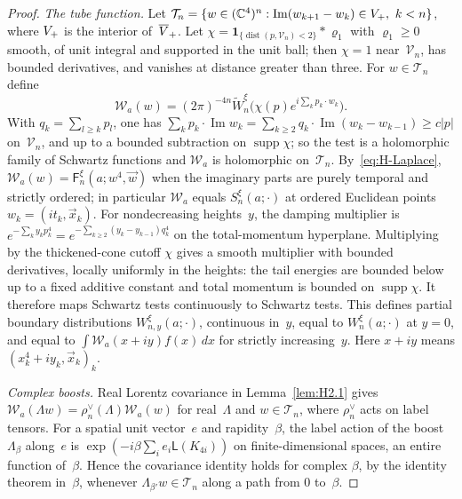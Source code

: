 \begin{proof}
\emph{The tube function.} Let $\mathcal T_n=\{w\in(\C^4)^n:\operatorname{Im}(w_{k+1}-w_k)\in\openforwardcone,\ k<n\}$, where $V_+$ is the interior of~$\overline{V}_+$. Let $\chi=\mathbf1_{\{\operatorname{dist}(p,\mathcal V_n)<2\}}*\varrho_1$ with $\varrho_1\ge0$ smooth, of unit integral and supported in the unit ball; then $\chi=1$ near~$\mathcal V_n$, has bounded derivatives, and vanishes at distance greater than three. For $w\in\mathcal T_n$ define
\begin{equation*}
\mathcal W_a(w)=(2\pi)^{-4n}\widetilde W_n^\xi\bigl(\chi(p)e^{i\sum_kp_k\cdot w_k}\bigr).
\end{equation*}
With $q_k=\sum_{l\ge k}p_l$, one has $\sum_kp_k\cdot\operatorname{Im}w_k=\sum_{k\ge2}q_k\cdot\operatorname{Im}(w_k-w_{k-1})\ge c|p|$ on~$\mathcal V_n$, and up to a bounded subtraction on $\operatorname{supp}\chi$; so the test is a holomorphic family of Schwartz functions and $\mathcal W_a$ is holomorphic on~$\mathcal T_n$. By~\eqref{eq:H-Laplace}, $\mathcal W_a(w)=\mathsf F^\xi_n(a;w^4,\vec w)$ when the imaginary parts are purely temporal and strictly ordered; in particular $\mathcal W_a$ equals $S^\xi_n(a;\cdot)$ at ordered Euclidean points $w_k=(it_k,\vec x_k)$. For nondecreasing heights~$y$, the damping multiplier is $e^{-\sum_ky_kp^4_k}=e^{-\sum_{k\ge2}(y_k-y_{k-1})q_k^4}$ on the total-momentum hyperplane. Multiplying by the thickened-cone cutoff $\chi$ gives a smooth multiplier with bounded derivatives, locally uniformly in the heights: the tail energies are bounded below up to a fixed additive constant and total momentum is bounded on $\operatorname{supp}\chi$. It therefore maps Schwartz tests continuously to Schwartz tests. This defines partial boundary distributions $W^\xi_{n,y}(a;\cdot)$, continuous in~$y$, equal to $W^\xi_n(a;\cdot)$ at $y=0$, and equal to $\int\mathcal W_a(x+iy)f(x)\,dx$ for strictly increasing~$y$. Here $x+iy$ means $(x_k^4+iy_k,\vec x_k)_k$.

\emph{Complex boosts.} Real Lorentz covariance in Lemma~\ref{lem:H2.1} gives $\mathcal W_a(\Lambda w)=\rho_n^\vee(\Lambda)\mathcal W_a(w)$ for real~$\Lambda$ and $w\in\mathcal T_n$, where $\rho_n^\vee$ acts on label tensors. For a spatial unit vector~$e$ and rapidity~$\beta$, the label action of the boost $\Lambda_\beta$ along~$e$ is $\exp(-i\beta\sum_ie_i\mathsf L(K_{4i}))$ on finite-dimensional spaces, an entire function of~$\beta$. Hence the covariance identity holds for complex $\beta$, by the identity theorem in~$\beta$, whenever $\Lambda_{\beta'}w\in\mathcal T_n$ along a path from $0$ to~$\beta$.


\end{proof}
